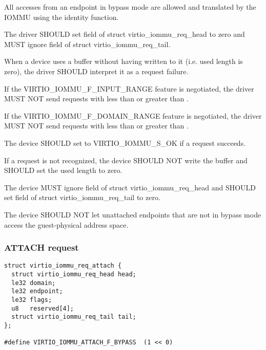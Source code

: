 All accesses from an endpoint in bypass mode are allowed and
translated by the IOMMU using the identity function.


The driver SHOULD set field  of struct
virtio_iommu_req_head to zero and MUST ignore field  of
struct virtio_iommu_req_tail.

When a device uses a buffer without having written to it (i.e.
used length is zero), the driver SHOULD interpret it as a request failure.

If the VIRTIO_IOMMU_F_INPUT_RANGE feature is negotiated, the driver MUST
NOT send requests with  less than
 or  greater than
.

If the VIRTIO_IOMMU_F_DOMAIN_RANGE feature is negotiated, the driver MUST
NOT send requests with  less than 
or greater than .


The device SHOULD set  to VIRTIO_IOMMU_S_OK if a request
succeeds.

If a request  is not recognized, the device SHOULD NOT write
the buffer and SHOULD set the used length to zero.

The device MUST ignore field  of struct
virtio_iommu_req_head and SHOULD set field  of struct
virtio_iommu_req_tail to zero.

The device SHOULD NOT let unattached endpoints that are not in
bypass mode access the guest-physical address space.

\subsubsection{ATTACH request}\label{sec:Device Types / IOMMU Device / Device operations / ATTACH request}

\begin{lstlisting}
struct virtio_iommu_req_attach {
  struct virtio_iommu_req_head head;
  le32 domain;
  le32 endpoint;
  le32 flags;
  u8   reserved[4];
  struct virtio_iommu_req_tail tail;
};

#define VIRTIO_IOMMU_ATTACH_F_BYPASS  (1 << 0)
\end{lstlisting}

